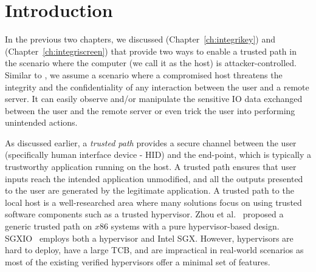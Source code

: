 \section{Introduction}
\label{sec:intro}


In the previous two chapters, we discussed \integrikey (Chapter~\ref{ch:integrikey}) and \integriscreen (Chapter~\ref{ch:integriscreen}) that provide two ways to enable a trusted path in the scenario where the computer (we call it as the host) is attacker-controlled. Similar to \integrikey, we assume a scenario where a compromised host threatens the integrity and the confidentiality of any interaction between the user and a remote server. It can easily observe and/or manipulate the sensitive IO data exchanged between the user and the remote server or even trick the user into performing unintended actions. 

As discussed earlier, a \emph{trusted path} provides a secure channel between the user (specifically human interface device - HID) and the end-point, which is typically a trustworthy application running on the host. A trusted path ensures that user inputs reach the intended application unmodified, and all the outputs presented to the user are generated by the legitimate application. A trusted path to the local host is a well-researched area where many solutions focus on using trusted software components such as a trusted hypervisor. Zhou et al.~\cite{zhou2012building} proposed a generic trusted path on $x86$ systems with a pure hypervisor-based design. SGXIO~\cite{weiser2017sgxio} employs both a hypervisor and Intel SGX. However, hypervisors are hard to deploy, have a large TCB, and are impractical in real-world scenarios as most of the existing verified hypervisors offer a minimal set of features. 

